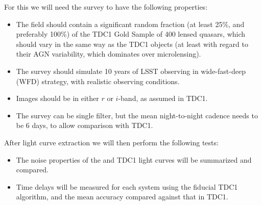 For this we will need the \TwinklesOne survey to have the following
properties:
\begin{itemize}
\item The field should contain a significant random fraction (at least
25\%,  and preferably 100\%) of the TDC1 Gold Sample of 400 lensed
quasars,  which should vary in the same way as the TDC1 objects (at
least with regard to their  AGN variability, which dominates over
microlensing).
\item The survey should simulate 10 years of LSST observing in
wide-fast-deep (WFD) strategy, with realistic observing conditions.
\item Images should be in either $r$ or $i$-band, as assumed in TDC1.
\item The survey can be single filter, but the mean night-to-night
cadence needs to be 6 days, to allow comparison with TDC1.
\end{itemize}

After light curve extraction we will then perform the following tests:
\begin{itemize}
\item The noise properties of the \TwinklesOne and TDC1 light curves
will be summarized and compared.
\item Time delays will be measured for each system using the fiducial
TDC1 algorithm, and the mean accuracy compared against that in TDC1.
\end{itemize}


